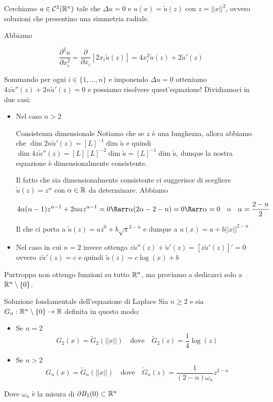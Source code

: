 \documentclass{book}
\begin{document}
Cerchiamo $u \in \mathcal{C}^2(\mathbb{R}^n)$ tale che $\Delta u = 0$ e $u(x) = \tilde{u}(z)$ con $z = ||x||^2$, ovvero soluzioni che presentino una simmetria radiale.

Abbiamo

\[\frac{\partial^2 u}{\partial x_i^2} = \frac{\partial}{\partial x_i} [2x_i\tilde{u}(z)] = 4x_i^2 \tilde{u}(z) + 2\tilde{u}'(z)\]

Sommando per ogni $i \in \{1,...,n\}$ e imponendo $\Delta u = 0$ otteniamo $4z\tilde{u}''(z) + 2n\tilde{u}'(z) = 0$ e possiamo risolvere quest'equazione! Dividiamoci in due casi:\begin{itemize}
\item Nel caso $n>2$
\begin{remark}{Consistenza dimensionale}{}
    Notiamo che se $z$ è una lunghezza, allora abbiamo che $\dim 2n\tilde{u}'(z) = [L]^{-1}\dim \tilde{u}$ e quindi $\dim 4z \tilde{u}''(z) = [L][L]^{-2}\dim\tilde{u} = [L]^{-1}\dim \tilde{u}$, dunque la nostra equazione è dimensionalmente consistente.
\end{remark}

Il fatto che sia dimensionalmente consistente ci suggerisce di scegliere $\tilde{u}(z) = z^\alpha$ con $\alpha \in \mathbb{R}$ da determinare. Abbiamo

\[4\alpha(\alpha-1)z^{\alpha-1} + 2n\alpha z^{\alpha - 1} = 0 \Rarr \alpha(2\alpha - 2 - n) = 0 \Rarr \alpha = 0 \quad \text{o}\quad \alpha = \frac{2-n}{2}\]

Il che ci porta a $\tilde{u}(z) = az^0 + b\sqrt{z}^{2-n}$ e dunque a $u(x) = a + b||x||^{2-n}$

\item Nel caso in cui $n=2$ invece ottengo $z\tilde{u}''(z) + \tilde{u}'(z) = [z\tilde{u}'(z)]'=0$ ovvero $z\tilde{u}'(z) = c$ e quindi $\tilde{u}(z) = c\log(x) + b$
\end{itemize}

Purtroppo non ottengo funzioni su tutto $\mathbb{R}^n$, ma proviamo a dedicarci solo a $\mathbb{R}^n\setminus\{0\}$.

\begin{definition}{Soluzione fondamentale dell'equazione di Laplace}{}
    Sia $n\ge 2$ e sia $G_n : \mathbb{R}^n\setminus\{0\}\to\mathbb{R}$ definita in questo modo:\begin{itemize}
        \item Se $n=2$ \[G_2(x) = \tilde{G}_2(||x||) \quad \text{dove} \quad \tilde{G}_2(z) = \frac{1}{4}\log(z)\]
        \item Se $n>2$ \[G_n(x) = \tilde{G}_n(||x||) \quad \text{dove} \quad \tilde{G}_n(z) =\frac{1}{(2-n)\omega_n} z^{2-n}\]
    \end{itemize}
    Dove $\omega_n$ è la misura di $\partial B_1(0)\subset \mathbb{R}^n$
\end{definition}
\end{document}
